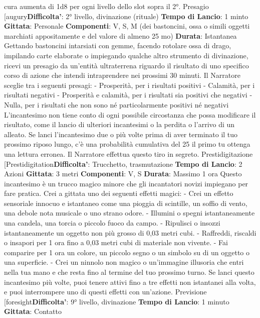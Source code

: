 \begin{multicols}{2}
cura aumenta di 1d8 per ogni livello dello slot sopra il
2°.
Presagio
[augury\textbf{Difficolta'}:
2° livello, divinazione (rituale)
\textbf{Tempo di Lancio}: 1 minto
\textbf{Gittata}: Personale
\textbf{Componenti}: V, S, M (dei bastoncini, ossa o simili
oggetti marchiati appositamente e del valore di almeno
25 mo)
\textbf{Durata}: Istantanea
Gettando bastoncini intarsiati con gemme, facendo
rotolare ossa di drago, impilando carte elaborate o
impiegando qualche altro strumento di divinazione,
ricevi un presagio da un’entità ultraterrena riguardo il
risultato di uno specifico corso di azione che intendi
intraprendere nei prossimi 30 minuti. Il Narratore sceglie tra i
seguenti presagi:
- Prosperità, per i risultati positivi
- Calamità, per i risultati negativi
- Prosperità e calamità, per i risultati sia positivi che
negativi
- Nulla, per i risultati che non sono né particolarmente
positivi né negativi
L’incantesimo non tiene conto di ogni possibile
circostanza che possa modificare il risultato, come il
lancio di ulteriori incantesimi o la perdita o l’arrivo di un
alleato.
Se lanci l’incantesimo due o più volte prima di aver
terminato il tuo prossimo riposo lungo, c’è una
probabilità cumulativa del 25%
il primo tu ottenga una lettura erronea. Il Narratore effettua
questo tiro in segreto.
Prestidigitazione
[Prestidigitation\textbf{Difficolta'}:
Trucchetto, trasmutazione
\textbf{Tempo di Lancio}: 2 Azioni
\textbf{Gittata}: 3 metri
\textbf{Componenti}: V, S
\textbf{Durata}: Massimo 1 ora
Questo incantesimo è un trucco magico minore che gli
incantatori novizi impiegano per fare pratica. Crei a
gittata uno dei seguenti effetti magici:
- Crei un effetto sensoriale innocuo e istantaneo
come una pioggia di scintille, un soffio di vento, una
debole nota musicale o uno strano odore.
- Illumini o spegni istantaneamente una candela, una
torcia o piccolo fuoco da campo.
- Ripulisci o insozzi istantaneamente un oggetto non
più grosso di 0,03 metri cubi.
- Raffreddi, riscaldi o insapori per 1 ora fino a 0,03
metri cubi di materiale non vivente.
- Fai comparire per 1 ora un colore, un piccolo segno
o un simbolo su di un oggetto o una superficie.
- Crei un ninnolo non magico o un’immagine illusoria
che entri nella tua mano e che resta fino al termine
del tuo prossimo turno.
Se lanci questo incantesimo più volte, puoi tenere attivi
fino a tre effetti non istantanei alla volta, e puoi
interrompere uno di questi effetti con un’azione.
Previsione
[foresight\textbf{Difficolta'}:
9° livello, divinazione
\textbf{Tempo di Lancio}: 1 minuto
\textbf{Gittata}: Contatto

\end{multicols}
